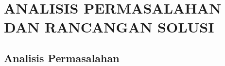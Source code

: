 \chapter{ANALISIS PERMASALAHAN DAN RANCANGAN SOLUSI}

\section{Analisis Permasalahan}
\label{section:permasalahan}




